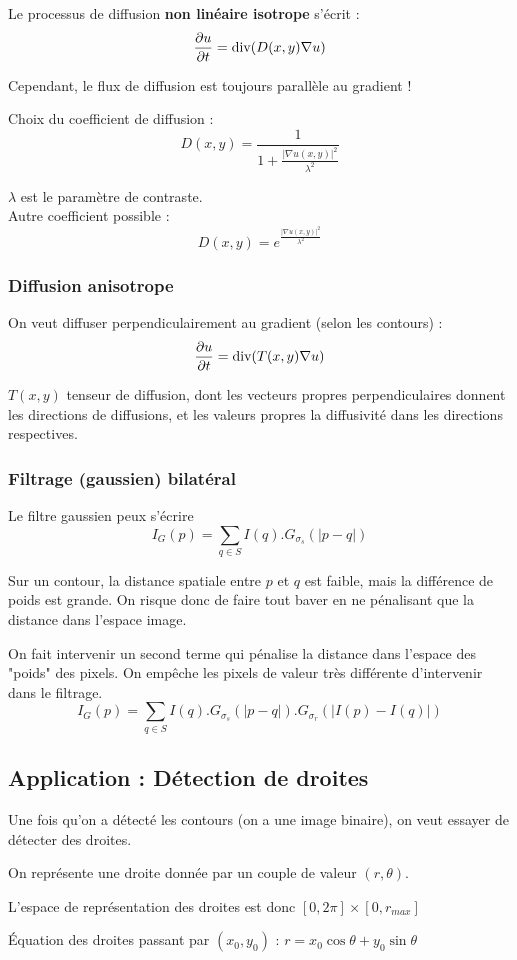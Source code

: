 \documentclass[main.tex]{subfiles}
\begin{document}
Le processus de diffusion \textbf{non linéaire isotrope} s'écrit :
\[ \derivp[u]{t}=\divv (D(x,y)\nabla u) \]

Cependant, le flux de diffusion est toujours parallèle au gradient !


Choix du coefficient de diffusion :
\[D(x,y)=\frac{1}{1+\frac{|\nabla u(x,y)|^2}{\lambda^2}}\]

$\lambda$ est le paramètre de contraste.\\

Autre coefficient possible :
\[D(x,y)=e^{\frac{|\nabla u(x,y)|^2}{\lambda^2}}\]

\subsubsection{Diffusion anisotrope} On veut diffuser perpendiculairement au gradient (selon les contours) :
\[ \derivp[u]{t}=\divv (T(x,y)\nabla u) \]

$T(x,y)$ tenseur de diffusion, dont les vecteurs propres perpendiculaires donnent les directions de diffusions, et les valeurs propres la diffusivité dans les directions respectives.

\subsubsection{Filtrage (gaussien) bilatéral}
\begin{defin}
Le filtre gaussien peux s'écrire
\[I_G(p)=\sum_{q\in S}I(q).G_{\sigma_s}(|p-q|)\]
\end{defin}

Sur un contour, la distance spatiale entre $p$ et $q$ est faible, mais la différence de poids est grande. On risque donc de faire tout baver en ne pénalisant que la distance dans l'espace image.
\begin{prop}
On fait intervenir un second terme qui pénalise la distance dans l'espace des "poids" des pixels. On empêche les pixels de valeur très différente d'intervenir dans le filtrage.
\[I_G(p)=\sum_{q\in S}I(q).G_{\sigma_s}(|p-q|).G_{\sigma_r}(|I(p)-I(q)|)\]

\end{prop}
\subsection{Application : Détection de droites}

Une fois qu'on a détecté les contours (on a une image binaire), on veut essayer de détecter des droites.\\
\begin{defin}

On représente une droite donnée par un couple de valeur $(r,\theta)$.

L'espace de représentation des droites est donc $[0,2\pi]\times[0,r_{max}]$

Équation des droites passant par $(x_0,y_0)$ : $r=x_0\cos\theta + y_0\sin\theta$
\end{defin}
\end{document}
